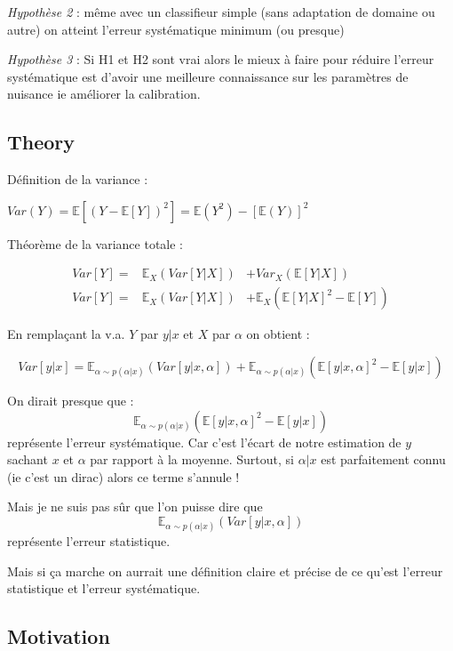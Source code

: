 \emph{Hypothèse 2} : même avec un classifieur simple (sans adaptation de domaine ou autre) on atteint l'erreur systématique minimum (ou presque)

\emph{Hypothèse 3} : Si H1 et H2 sont vrai alors le mieux à faire pour réduire l'erreur systématique est d'avoir une meilleure connaissance sur les paramètres de nuisance ie améliorer la calibration.

\subsection{Theory} %
\label{sub:theory}


Définition de la variance :

$Var(Y) = \mathbb E[(Y - \mathbb E[Y])^2] = \mathbb E(Y^2) - [\mathbb E(Y)]^2$

Théorème de la variance totale :

\begin{eqnarray}
    Var[Y] =& \mathbb E_X \left (Var[Y|X] \right ) &+ Var_X \left (\mathbb E[Y|X]\right ) \\
    Var[Y] =& \mathbb E_X \left (Var[Y|X] \right ) &+ \mathbb E_X \left (\mathbb E [Y|X]^2  - \mathbb E[Y]\right )
\end{eqnarray}


En remplaçant la v.a. $Y$ par $y|x$ et $X$ par $\alpha$ on obtient :

$$
Var[y|x] = \mathbb E_{\alpha \sim p(\alpha|x)} \left (Var[y|x, \alpha] \right ) + \mathbb E_{\alpha \sim p(\alpha|x)} \left (\mathbb E [y|x, \alpha]^2  - \mathbb E[y|x]\right )
$$


On dirait presque que : 
$$\mathbb E_{\alpha \sim p(\alpha|x)} \left (\mathbb E [y|x, \alpha]^2  - \mathbb E[y|x]\right )$$
représente l'erreur systématique. 
Car c'est l'écart de notre estimation de $y$ sachant $x$ et $\alpha$ par rapport à la moyenne.
Surtout, si $\alpha|x$ est parfaitement connu (ie c'est un dirac) alors ce terme s'annule !

Mais je ne suis pas sûr que l'on puisse dire que
$$\mathbb E_{\alpha \sim p(\alpha|x)} \left (Var[y|x, \alpha] \right )$$
représente l'erreur statistique.

Mais si ça marche on aurrait une définition claire et précise de ce qu'est l'erreur statistique et l'erreur systématique.


\subsection{Motivation} %
\label{sub:motivation}

